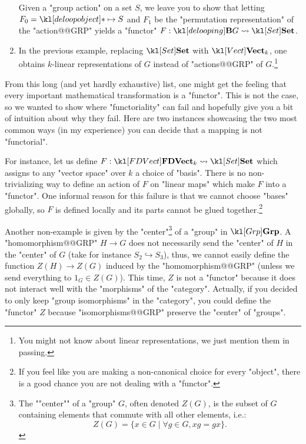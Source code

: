\documentclass[main.tex]{subfiles}
\begin{document}
\begin{exmps}
\begin{enumerate}
		Given a "group action" on a set $S$, we leave you to show that letting $F_0 = \deloopobject \mapsto S$ and $F_1$ be the "permutation representation" of the "action@@GRP" yields a "functor" $F:\deloop{G} \rightsquigarrow \catSet$.
		
		\item In the previous example, replacing $\catSet$ with $\catVect{k}$, one obtains $k$-linear representations of $G$ instead of "actions@@GRP" of $G$.\footnote{You might not know about linear representations, we just mention them in passing.}
	\end{enumerate}
\end{exmps}
\begin{rem}
    From this long (and yet hardly exhaustive) list, one might get the feeling that every important mathematical transformation is a "functor". This is not the case, so we wanted to show where "functoriality" can fail and hopefully give you a bit of intuition about why they fail. Here are two instances showcasing the two most common ways (in my experience) you can decide that a mapping is not "functorial".
    
    For instance, let us define $F: \catFDVect{k} \rightsquigarrow \catSet$ which assigns to any "vector space" over $k$ a choice of "basis". There is no non-trivializing way to define an action of $F$ on "linear maps" which make $F$ into a "functor". One informal reason for this failure is that we cannot choose "bases" globally, so $F$ is defined locally and its parts cannot be glued together.\footnote{If you feel like you are making a non-canonical choice for every "object", there is a good chance you are not dealing with a "functor".}
	
	Another non-example is given by the "center"\footnote{The ""center"" of a "group" $G$, often denoted $Z(G)$, is the subset of $G$ containing elements that commute with all other elements, i.e.:
	\[Z(G) = \{x \in G \mid \forall g \in G, xg = gx\}.\]} of a "group" in $\catGrp$. A "homomorphism@@GRP" $H \rightarrow G$ does not necessarily send the "center" of $H$ in the "center" of $G$ (take for instance $S_2 \hookrightarrow S_3$), thus, we cannot easily define the function $Z(H) \rightarrow Z(G)$ induced by the "homomorphism@@GRP" (unless we send everything to $1_G \in Z(G)$). This time, $Z$ is not a "functor" because it does not interact well with the "morphisms" of the "category". Actually, if you decided to only keep "group isomorphisms" in the "category", you could define the "functor" $Z$ because "isomorphisms@@GRP" preserve the "center" of "groups".
\end{rem}
\end{document}
